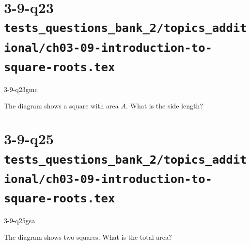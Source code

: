 \documentclass[12pt, fleqn, openany]{studyGuide}
\begin{document}
\newpage
\section*{3-9-q23 \hfill \normalsize\texttt{tests\_questions\_bank\_2/topics\_additional/ch03-09-introduction-to-square-roots.tex}}
\begin{practiceQuestion}{3-9-q23}{gmc}
\begin{questionText}
The diagram shows a square with area $A$. What is the side length?

\begin{center}
\end{center}
\end{questionText}
\end{practiceQuestion}

\newpage
\section*{3-9-q25 \hfill \normalsize\texttt{tests\_questions\_bank\_2/topics\_additional/ch03-09-introduction-to-square-roots.tex}}
\begin{practiceQuestion}{3-9-q25}{gsa}
\begin{questionText}
The diagram shows two squares. What is the total area?

\begin{center}
\end{center}
\end{questionText}
\end{practiceQuestion}

\newpage
\end{document}
